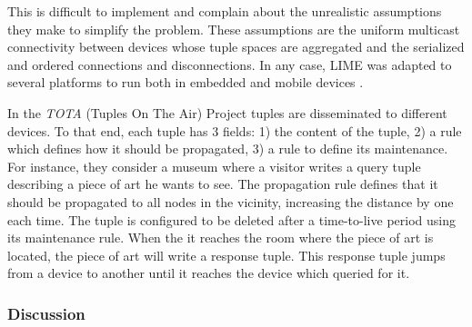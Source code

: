 This is difficult to implement and \citet{coulouris_distributed_2012} complain about the unrealistic assumptions they make to simplify the problem. %
These assumptions are the uniform multicast connectivity between devices whose tuple spaces are aggregated and the serialized and ordered connections and disconnections.
In any case, LIME was adapted to several platforms to run both in embedded and mobile devices \citep{murphy_transiently_2006}.


In the \emph{TOTA} (Tuples On The Air) Project \citep{mamei_programming_2009} tuples are disseminated to different devices.
To that end, each tuple has 3 fields:
1) the content of the tuple,
2) a rule which defines how it should be propagated,
3) a rule to define its maintenance.
For instance, they consider a museum where a visitor writes a query tuple describing a piece of art he wants to see.
The propagation rule defines that it should be propagated to all nodes in the vicinity, increasing the distance by one each time.
The tuple is configured to be deleted after a time-to-live period using its maintenance rule.
When the it reaches the room where the piece of art is located, the piece of art will write a response tuple.
This response tuple jumps from a device to another until it reaches the device which queried for it.






\subsubsection{Discussion} %

